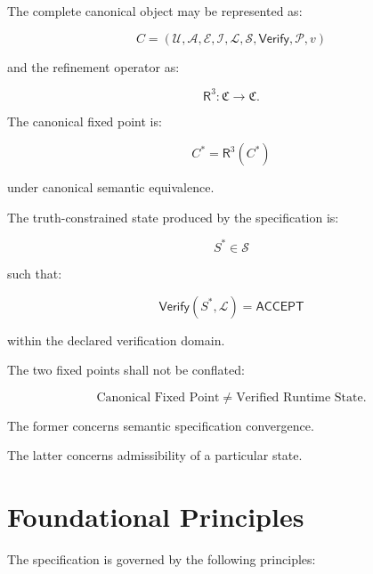 \documentclass[11pt]{article}
\newcommand{\Rthree}{\ensuremath{\mathsf{R}^{3}}}
\newcommand{\Purpose}{\mathcal{U}}
\newcommand{\Authority}{\mathcal{A}}
\newcommand{\Evidence}{\mathcal{E}}
\newcommand{\Inv}{\mathcal{I}}
\newcommand{\State}{\mathcal{S}}
\newcommand{\Law}{\mathcal{L}}
\newcommand{\Prov}{\mathcal{P}}
\newcommand{\Verify}{\mathsf{Verify}}
\newcommand{\Accept}{\mathsf{ACCEPT}}
\begin{document}
The complete canonical object may be represented as:

\[
\boxed{
C=
(
\Purpose,
\Authority,
\Evidence,
\Inv,
\Law,
\State,
\Verify,
\Prov,
v
)
}
\]

and the refinement operator as:

\[
\boxed{
\Rthree:
\mathfrak{C}\rightarrow\mathfrak{C}.
}
\]

The canonical fixed point is:

\[
\boxed{
C^{*}
=
\Rthree(C^{*})
}
\]

under canonical semantic equivalence.

The truth-constrained state produced by the specification is:

\[
\boxed{
S^{*}
\in
\State
}
\]

such that:

\[
\boxed{
\Verify(S^{*},\Law)=\Accept
}
\]

within the declared verification domain.

The two fixed points shall not be conflated:

\[
\boxed{
\text{Canonical Fixed Point}
\neq
\text{Verified Runtime State}.
}
\]

The former concerns semantic specification convergence.

The latter concerns admissibility of a particular state.

\section{Foundational Principles}

The specification is governed by the following principles:
\end{document}
